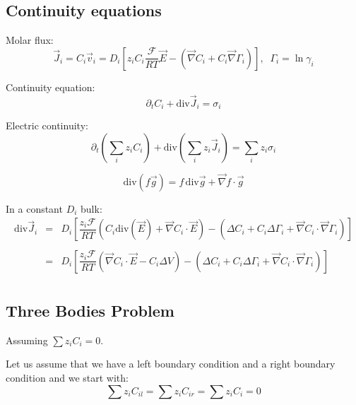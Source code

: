 \documentclass[aps,12pt]{revtex4}
\begin{document}
\subsection{Continuity equations}

Molar flux:
\begin{equation}
	\vec{J}_i = C_i \vec{v}_i = D_i \left[z_i C_i  \dfrac{\mathcal{F}}{RT} \vec{E} - \left(\vec{\nabla} C_i + C_i \vec{\nabla}\Gamma_i\right) \right],\;\;\Gamma_i = \ln \gamma_i
\end{equation}

Continuity equation:
\begin{equation}
	\partial_t C_i + \mathrm{div} \vec{J}_i = \sigma_i
\end{equation}

Electric continuity:
\begin{equation}
	\partial_t \left(\sum_i z_i C_i\right) + \mathrm{div} \left(\sum_i z_i \vec{J}_i\right) = \sum_i z_i \sigma_i
\end{equation}


\begin{equation}
	\mathrm{div}(f\vec{g}) = f \, \mathrm{div}\vec{g} + \vec{\nabla} f \cdot \vec{g}
\end{equation}

In a constant $D_i$ bulk:
\begin{equation}
\begin{array}{rcl}
\mathrm{div} \vec{J}_i & = & D_i \left[ \dfrac{z_i\mathcal{F}}{RT} 
\left(C_i \mathrm{div}\left(\vec{E}\right) + \vec{\nabla} C_i \cdot \vec{E} \right) 
- \left( \Delta C_i + C_i \Delta \Gamma_i + \vec{\nabla} C_i \cdot \vec{\nabla} \Gamma_i \right)
\right]\\
\\
 & = &  D_i \left[ \dfrac{z_i\mathcal{F}}{RT} 
\left(  \vec{\nabla} C_i \cdot \vec{E} - C_i \Delta V \right) 
- \left( \Delta C_i + C_i \Delta \Gamma_i + \vec{\nabla} C_i \cdot \vec{\nabla} \Gamma_i \right)
\right]\\
\end{array}
\end{equation}

\subsection{Three Bodies Problem}

 	
Assuming $\sum z_i C_i = 0$.

Let us assume that we have a left boundary condition and a right boundary condition
and we start with:
\begin{equation}
	\sum z_i C_{il} = \sum z_i C_{ir} = \sum z_i C_i = 0
\end{equation}
\end{document}
